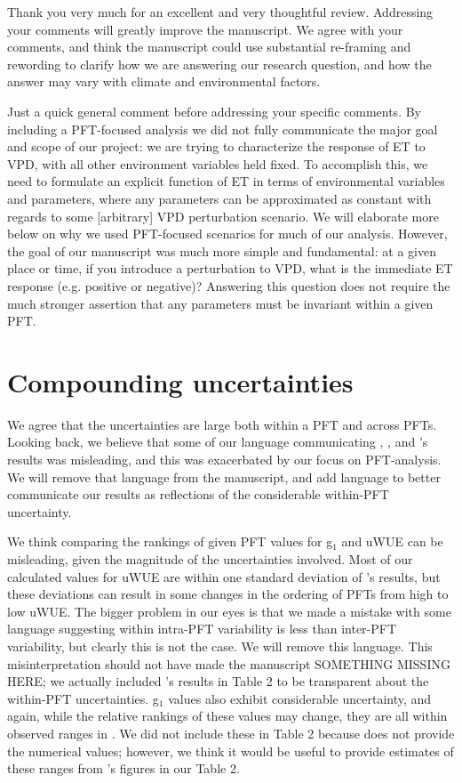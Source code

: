 \RequirePackage{natbib}


Thank you very much for an excellent and very thoughtful
review. Addressing your comments will greatly improve the
manuscript. We agree with your comments, and think the manuscript
could use substantial re-framing and rewording to clarify how we are
answering our research question, and how the answer may vary with
climate and environmental factors.

Just a quick general comment before addressing your specific
comments. By including a PFT-focused analysis we did not fully communicate the major goal and scope of our project: we are
trying to characterize the response of ET to VPD, with all other
environment variables held fixed. To accomplish this, we need to
formulate an explicit function of ET in terms of environmental
variables and parameters, where any parameters can be approximated as
constant with regards to some [arbitrary] VPD perturbation
scenario. We will elaborate more below on why we used PFT-focused
scenarios for much of our analysis. However, the goal of our
manuscript was much more simple and fundamental: at a given place or
time, if you introduce a perturbation to VPD, what is the immediate ET
response (e.g. positive or negative)? Answering this question does not
require the much stronger assertion that any parameters must be
invariant within a given PFT.

\section{Compounding uncertainties}

We agree that the uncertainties are large both within a PFT and across
PFTs. Looking back, we believe that some of our language
communicating \cite{Lin_2018}, \cite{Medlyn_2017}, and
\cite{Zhou_2014}'s results was misleading, and this was exacerbated by
our focus on PFT-analysis. We will remove that language from the
manuscript, and add language to better communicate our results as
reflections of the considerable within-PFT uncertainty.

We think comparing the rankings of given PFT values for g$_1$ and uWUE
can be misleading, given the magnitude of the uncertainties
involved. Most of our calculated values for uWUE are within one
standard deviation of \cite{Zhou_2015}'s results, but these deviations
can result in some changes in the ordering of PFTs from high to low
uWUE. The bigger problem in our eyes is that we made a mistake with
some language suggesting within intra-PFT variability is less than
inter-PFT variability, but clearly this is not the case. We will
remove this language. This misinterpretation should not have made the
manuscript SOMETHING MISSING HERE; we actually included \cite{Zhou_2015}'s results in Table 2
to be transparent about the within-PFT uncertainties. g$_1$ values
also exhibit considerable uncertainty, and again, while the relative
rankings of these values may change, they are all within observed
ranges in \cite{Medlyn_2017}. We did not include these in Table 2
because \cite{Medlyn_2017} does not provide the numerical values;
however, we think it would be useful to provide estimates of these
ranges from \cite{Medlyn_2017}'s figures in our Table 2.

